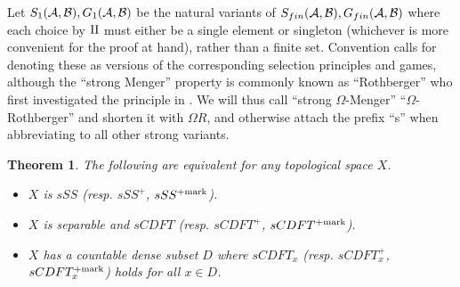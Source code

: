 \documentclass{amsart}
\theoremstyle{plain}
\newtheorem{theorem}{Theorem}
\theoremstyle{definition}
\theoremstyle{remark}
\theoremstyle{plain}
\theoremstyle{definition}
\theoremstyle{remark}
\begin{document}
Let \(S_{1}(\mathcal{A},\mathcal{B}),G_{1}(\mathcal{A},\mathcal{B})\)
be the natural variants of
\(S_{fin}(\mathcal{A},\mathcal{B}),G_{fin}(\mathcal{A},\mathcal{B})\) where each choice
by \(\mathrm{II}\) must either be a single element or singleton
(whichever is more convenient for the proof at hand), rather than a finite
set. Convention calls for denoting these as
 versions of the corresponding selection principles and games,
although the ``strong Menger'' property is commonly known as ``Rothberger''
who first investigated the principle in \cite{Rothberger1938}. We will thus
call ``strong \(\Omega\)-Menger'' ``\(\Omega\)-Rothberger'' and shorten it
with \(\Omega R\), and otherwise attach the prefix ``s''
when abbreviating to all other strong variants.

\begin{theorem}
  The following are equivalent for any topological space \(X\).
  \begin{itemize}
    \item \(X\) is \(sSS\) (resp. \(sSS^+\), \(sSS^{+\mathrm{mark}}\)).
    \item \(X\) is separable and \(sCDFT\)
          (resp. \(sCDFT^+\), \(sCDFT^{+\mathrm{mark}}\)).
    \item \(X\) has a countable dense subset \(D\) where
          \(sCDFT_x\) (resp. \(sCDFT_x^+\), \(sCDFT_x^{+\mathrm{mark}}\))
          holds for all \(x\in D\).
  \end{itemize}
\end{theorem}
\end{document}
